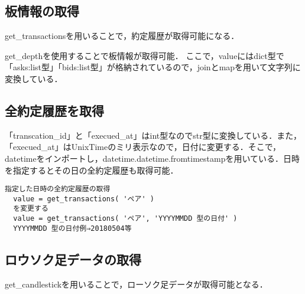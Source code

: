 \subsection{板情報の取得}
get\_transactionsを用いることで，約定履歴が取得可能になる．

get\_depthを使用することで板情報が取得可能．
ここで，valueにはdict型で「asks:list型」「bids:list型」が格納されているので，joinとmapを用いて文字列に変換している．
\newpage

\subsection{全約定履歴を取得}

「transcation\_id」と「execued\_at」はint型なのでstr型に変換している．また，「execued\_at」はUnixTimeのミリ表示なので，日付に変更する．そこで，datetimeをインポートし，datetime.datetime.fromtimestampを用いている．日時を指定するとその日の全約定履歴も取得可能．
\begin{lstlisting}[caption=bitbank3.5,label=bitbank3.5]
  指定した日時の全約定履歴の取得
  value = get_transactions( 'ペア' )
  を変更する
  value = get_transactions( 'ペア', 'YYYYMMDD 型の日付' )
  YYYYMMDD 型の日付例⇒20180504等
\end{lstlisting}
\newpage

\subsection{ロウソク足データの取得}
get\_candlestickを用いることで，ローソク足データが取得可能となる．
